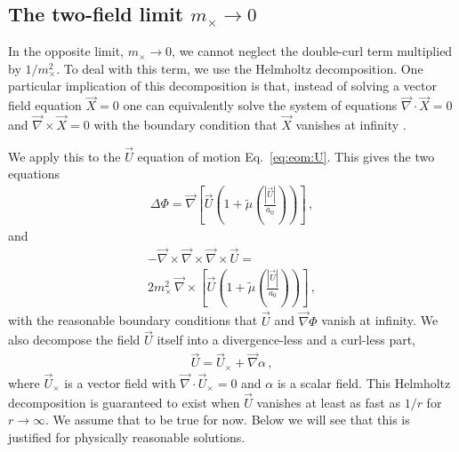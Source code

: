 \documentclass[reprint, amsmath,amssymb, nofootinbib, aps, prd]{revtex4-2}
\begin{document}
\subsection{The two-field limit $m_\times \to 0$}
\label{sec:twofield}

In the opposite limit, $m_\times \to 0$, we cannot neglect the double-curl term multiplied by $1/m_\times^2$.
To deal with this term, we use the Helmholtz decomposition.
One particular implication of this decomposition is that, instead of solving a vector field equation $\vec{X} = 0$ one can equivalently solve the system of equations $\vec{\nabla} \cdot \vec{X} = 0$ and $\vec{\nabla} \times \vec{X} = 0$ with the boundary condition that $\vec{X}$ vanishes at infinity \citep{Griffiths2013}.

We apply this to the $\vec{U}$ equation of motion Eq.~\eqref{eq:eom:U}.
This gives the two equations
\begin{align}
\label{eq:Ueomdecomp:div}
 \Delta \Phi = \vec{\nabla} \left[ \vec{U} \left(1 + \tilde{\mu}\left(\frac{|\vec{U}|}{a_0}\right)\right) \right] \,,
\end{align}
and
\begin{multline}
\label{eq:Ueomdecomp:curl}
 - \vec{\nabla} \times \vec{\nabla} \times \vec{\nabla} \times \vec{U} = \\
  2 m_\times^2 \, \vec{\nabla} \times \left[ \vec{U} \left(1 + \tilde{\mu}\left(\frac{|\vec{U}|}{a_0}\right)\right) \right] \,,
\end{multline}
with the reasonable boundary conditions that $\vec{U}$ and $\vec{\nabla} \Phi$ vanish at infinity.
We also decompose the field $\vec{U}$ itself into a divergence-less and a curl-less part,
\begin{align}
 \label{eq:Udecomp}
 \vec{U} = \vec{U}_\times + \vec{\nabla} \alpha \,,
\end{align}
where $\vec{U}_\times$ is a vector field with $\vec{\nabla} \cdot \vec{U}_\times = 0$ and $\alpha$ is a scalar field.
This Helmholtz decomposition is guaranteed to exist when $\vec{U}$ vanishes at least as fast as $1/r$ for $r \to \infty$.
We assume that to be true for now.
Below we will see that this is justified for physically reasonable solutions.
\end{document}
